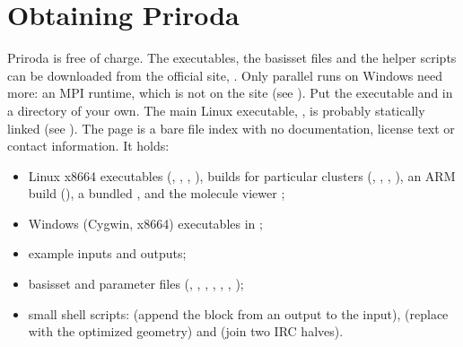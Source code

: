 \documentclass[letterpaper,10pt,english,openany,oneside]{sphinxmanual}
\begin{document}
\section{Obtaining Priroda}
\label{\detokenize{start/running:obtaining-priroda}}\label{\detokenize{start/running:id1}}
\sphinxAtStartPar
Priroda is free of charge. The executables, the basis\sphinxhyphen{}set files and the helper scripts can be downloaded from the
official site, . Only parallel runs on Windows need more: an MPI runtime, which
is not on the site (see {\hyperref[\detokenize{start/parallel:running-windows-parallel}]{}}). Put the executable and  in a directory of your
own. The main Linux executable, , is probably statically linked (see {\hyperref[\detokenize{start/running:executables}]{}}). The page is a bare file
index with no documentation, license text or contact information. It holds:
\begin{itemize}
\item {} 
\sphinxAtStartPar
Linux x86\sphinxhyphen{}64 executables (, , , ), builds for particular clusters (, , ,
), an ARM build (), a bundled , and the molecule viewer ;

\item {} 
\sphinxAtStartPar
Windows (Cygwin, x86\sphinxhyphen{}64) executables in ;

\item {} 
\sphinxAtStartPar
example inputs and outputs;

\item {} 
\sphinxAtStartPar
basis\sphinxhyphen{}set and parameter files (, , , , , , );

\item {} 
\sphinxAtStartPar
small shell scripts:  (append the  block from an output to the input),  (replace  with
the optimized geometry) and  (join two IRC halves).

\end{itemize}
\end{document}
